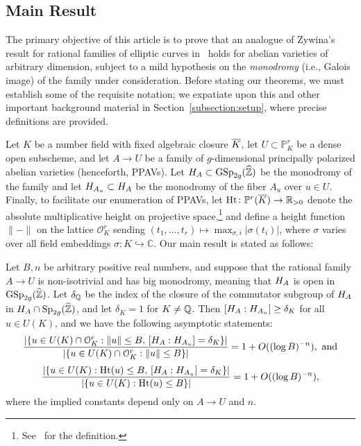 \subsection{Main Result}\label{weaintevergonnaberoyals}

The primary objective of this article is to prove that an analogue of Zywina's result for rational families of elliptic curves in~\cite[Theorem 1.15]{zywina2010hilbert} holds for abelian varieties of arbitrary dimension, subject to a mild hypothesis on the \emph{monodromy} (i.e., Galois image) of the family under consideration. Before stating our theorems, we must establish some of the requisite notation; we expatiate upon this and other important background material in Section~\ref{subsection:setup}, where precise definitions are provided.

Let $K$ be a number field with fixed algebraic closure $\overline{K}$, let $U \subset \mathbb P^r_K$ be a dense open subscheme, and let $A \rightarrow U$ be a family of $g$-dimensional principally polarized abelian varieties (henceforth, PPAVs). Let $H_A \subset \operatorname{GSp}_{2g}(\widehat{\mathbb Z})$ be the monodromy of the family
and let $H_{A_u} \subset H_A$ be the monodromy of the fiber $A_u$ over $u \in U$. Finally, to facilitate our enumeration of PPAVs, let $\operatorname{Ht}\colon\mathbb P^r(\overline K) \rightarrow \mathbb R_{>0}$
denote the absolute multiplicative height on projective space,\footnote{See~\cite[Section B.2, p.~174]{afraidofheights} for the definition.}
and define a height function $\| - \|$ on the lattice $\mathcal O^r_K$
sending $\left( t_1, \ldots, t_r \right) \mapsto \max_{\sigma,i}|\sigma(t_i)|$,
where $\sigma$ varies over all field embeddings $\sigma\colon K \hookrightarrow \mathbb C$.
Our main result is stated as follows:
\begin{theorem} \label{theorem:main}
	Let $B, n$ be arbitrary positive real numbers, and suppose that the rational family $A \to U$ is non-isotrivial and has big monodromy, meaning that $H_A$ is open in $\operatorname{GSp}_{2g}(\widehat{{\mathbb Z}})$. Let $\delta_\mathbb Q$ be the index of the closure of the commutator subgroup of $H_A$ in $H_A \cap \operatorname{Sp}_{2g}(\widehat{{\mathbb Z}})$, and let $\delta_K = 1$ for $K \neq \mathbb Q$. Then $[H_A : H_{A_u}] \geq \delta_K$ for all $u \in U(K)$, and we have the following asymptotic statements:
			\[
				\frac{|\{u \in U(K) \cap \mathcal{O}_K^r : \lVert u \rVert \le B,\, [H_A : H_{A_u}] = \delta_K\}|}{|\{u \in U(K) \cap \mathcal{O}_K^r : \lVert u \rVert \le B\}|} = 1 + O((\log B)^{-n}), \text{ and}
			\]
\[
				\frac{|\{u \in U(K) : \operatorname{Ht}(u) \leq B,\, [H_A : H_{A_u}] = \delta_K\}|}{|\{u \in U(K) : \operatorname{Ht}(u) \le B\}|} = 1 + O((\log B)^{-n}),
			\]
	 where the implied constants depend only on $A \to U$ and $n$.
\end{theorem}

